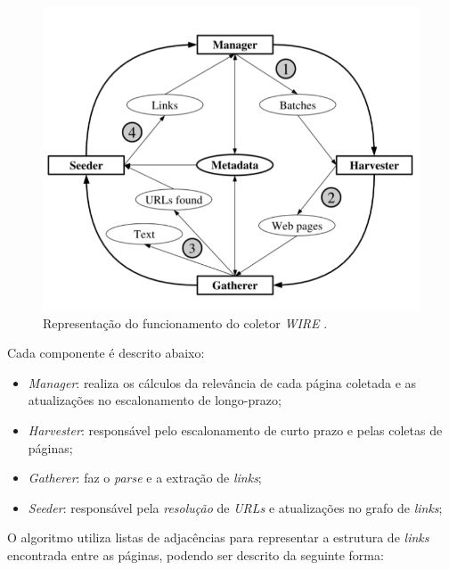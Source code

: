 \documentclass[a4paper,12pt,titlepage]{article}
\begin{document}
\begin{figure}[H]
     \centering
     \includegraphics[scale=0.45]{figures/wire-crawling-architecture-2.png}
     \caption{Representação do funcionamento do coletor \textit{WIRE} \cite{carlos}.}
     \label{bsp}
\end{figure}

Cada componente é descrito abaixo: 

\begin{itemize}
\item \textit{Manager}: realiza os cálculos da relevância de cada página coletada e as atualizações no escalonamento de longo-prazo;
\item \textit{Harvester}: responsável pelo escalonamento de curto prazo e pelas coletas de páginas;
\item \textit{Gatherer}: faz o \textit{parse} e a extração de \textit{links};
\item \textit{Seeder}: responsável pela \textit{resolução} de \textit{URLs} e atualizações no grafo de \textit{links};
\end{itemize} 

O algoritmo utiliza listas de adjacências para representar a estrutura de \textit{links} encontrada entre as páginas, podendo ser descrito da seguinte forma:
\end{document}
